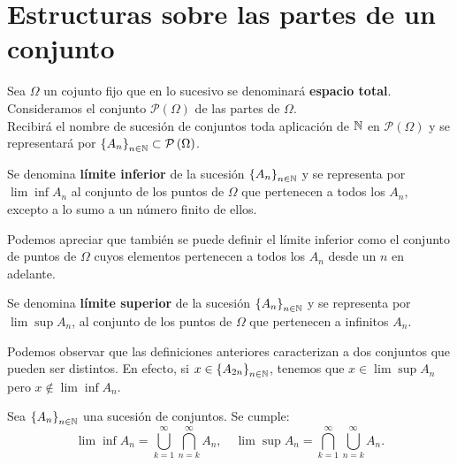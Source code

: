 \chapter{Estructuras sobre las partes de un conjunto}
Sea $\displaystyle \Omega  $ un cojunto fijo que en lo sucesivo se denominará \textbf{espacio total}. Consideramos el conjunto $\displaystyle \mathcal{P}\left(\Omega \right) $ de las partes de $\displaystyle \Omega  $. \\ 
Recibirá el nombre de sucesión de conjuntos toda aplicación de $\displaystyle \mathbb{N} $ en $\displaystyle \mathcal{P}\left(\Omega \right) $ y se representará por $\displaystyle \left\{ A_{n}\right\} _{n\in\mathbb{N}}\subset \mathcal{P}\left(\Omega \right) $.
\begin{definition}
	Se denomina \textbf{límite inferior} de la sucesión $\displaystyle \left\{ A_{n}\right\} _{n\in\mathbb{N}} $ y se representa por $\displaystyle \lim \inf A_{n} $ al conjunto de los puntos de $\displaystyle \Omega  $ que pertenecen a todos los $\displaystyle A_{n} $, excepto a lo sumo a un número finito de ellos.
\end{definition}
Podemos apreciar que también se puede definir el límite inferior como el conjunto de puntos de $\displaystyle \Omega  $ cuyos elementos pertenecen a todos los $\displaystyle A_{n} $ desde un $\displaystyle n $ en adelante. 
\begin{definition}
	Se denomina \textbf{límite superior} de la sucesión $\displaystyle \left\{ A_{n}\right\} _{n\in\mathbb{N}} $ y se representa por $\displaystyle \lim \sup A_{n} $, al conjunto de los puntos de $\displaystyle \Omega  $ que pertenecen a infinitos $\displaystyle A_{n} $.
\end{definition}
\begin{observation}
	Podemos observar que las definiciones anteriores caracterizan a dos conjuntos que pueden ser distintos. En efecto, si $\displaystyle x \in \left\{ A_{2n}\right\} _{n\in\mathbb{N}} $, tenemos que $\displaystyle x \in \lim \sup A_{n} $ pero $\displaystyle x \not\in \lim \inf A_{n} $.
\end{observation}
\begin{prop}
	Sea $\displaystyle \left\{ A_{n}\right\} _{n\in\mathbb{N}} $ una sucesión de conjuntos. Se cumple:
	\[\lim \inf A_{n} = \bigcup_{k = 1}^{\infty}\bigcap_{n = k}^{\infty}A_{n}, \quad \lim \sup A_{n} = \bigcap_{k = 1}^{\infty}\bigcup_{n = k}^{\infty}A_{n} .\]
\end{prop}
